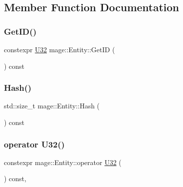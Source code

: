 \subsection{Member Function Documentation}
\mbox{\label{classmage_1_1_entity_a50f8ec2e424e3677c6686b8545d82808}} 
\subsubsection{\texorpdfstring{Get\+I\+D()}{GetID()}}
{\footnotesize\ttfamily constexpr \mbox{\hyperlink{namespacemage_aa5d6eaabaac3cdd01873d6a3d27e90f3}{U32}} mage\+::\+Entity\+::\+Get\+ID (\begin{DoxyParamCaption}{ }\end{DoxyParamCaption}) const\hspace{0.3cm}{\ttfamily [noexcept]}}

\mbox{\label{classmage_1_1_entity_a3a3c4da60750874d5db240dbd15ff81d}} 
\subsubsection{\texorpdfstring{Hash()}{Hash()}}
{\footnotesize\ttfamily std\+::size\+\_\+t mage\+::\+Entity\+::\+Hash (\begin{DoxyParamCaption}{ }\end{DoxyParamCaption}) const\hspace{0.3cm}{\ttfamily [noexcept]}}

\mbox{\label{classmage_1_1_entity_ab79e38d311acf3d734f1e944ccab6404}} 
\subsubsection{\texorpdfstring{operator U32()}{operator U32()}}
{\footnotesize\ttfamily constexpr mage\+::\+Entity\+::operator \mbox{\hyperlink{namespacemage_aa5d6eaabaac3cdd01873d6a3d27e90f3}{U32}} (\begin{DoxyParamCaption}{ }\end{DoxyParamCaption}) const\hspace{0.3cm}{\ttfamily [explicit]}, {\ttfamily [noexcept]}}

